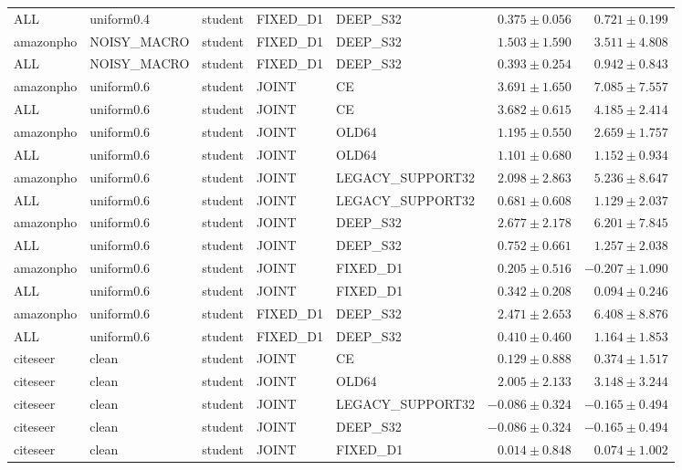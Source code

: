 \begin{longtable}{lllllrr}
ALL & uniform0.4 & student & FIXED\_D1 & DEEP\_S32 & $0.375 \pm 0.056$ & $0.721 \pm 0.199$ \\
amazonpho & NOISY\_MACRO & student & FIXED\_D1 & DEEP\_S32 & $1.503 \pm 1.590$ & $3.511 \pm 4.808$ \\
ALL & NOISY\_MACRO & student & FIXED\_D1 & DEEP\_S32 & $0.393 \pm 0.254$ & $0.942 \pm 0.843$ \\
amazonpho & uniform0.6 & student & JOINT & CE & $3.691 \pm 1.650$ & $7.085 \pm 7.557$ \\
ALL & uniform0.6 & student & JOINT & CE & $3.682 \pm 0.615$ & $4.185 \pm 2.414$ \\
amazonpho & uniform0.6 & student & JOINT & OLD64 & $1.195 \pm 0.550$ & $2.659 \pm 1.757$ \\
ALL & uniform0.6 & student & JOINT & OLD64 & $1.101 \pm 0.680$ & $1.152 \pm 0.934$ \\
amazonpho & uniform0.6 & student & JOINT & LEGACY\_SUPPORT32 & $2.098 \pm 2.863$ & $5.236 \pm 8.647$ \\
ALL & uniform0.6 & student & JOINT & LEGACY\_SUPPORT32 & $0.681 \pm 0.608$ & $1.129 \pm 2.037$ \\
amazonpho & uniform0.6 & student & JOINT & DEEP\_S32 & $2.677 \pm 2.178$ & $6.201 \pm 7.845$ \\
ALL & uniform0.6 & student & JOINT & DEEP\_S32 & $0.752 \pm 0.661$ & $1.257 \pm 2.038$ \\
amazonpho & uniform0.6 & student & JOINT & FIXED\_D1 & $0.205 \pm 0.516$ & $-0.207 \pm 1.090$ \\
ALL & uniform0.6 & student & JOINT & FIXED\_D1 & $0.342 \pm 0.208$ & $0.094 \pm 0.246$ \\
amazonpho & uniform0.6 & student & FIXED\_D1 & DEEP\_S32 & $2.471 \pm 2.653$ & $6.408 \pm 8.876$ \\
ALL & uniform0.6 & student & FIXED\_D1 & DEEP\_S32 & $0.410 \pm 0.460$ & $1.164 \pm 1.853$ \\
citeseer & clean & student & JOINT & CE & $0.129 \pm 0.888$ & $0.374 \pm 1.517$ \\
citeseer & clean & student & JOINT & OLD64 & $2.005 \pm 2.133$ & $3.148 \pm 3.244$ \\
citeseer & clean & student & JOINT & LEGACY\_SUPPORT32 & $-0.086 \pm 0.324$ & $-0.165 \pm 0.494$ \\
citeseer & clean & student & JOINT & DEEP\_S32 & $-0.086 \pm 0.324$ & $-0.165 \pm 0.494$ \\
citeseer & clean & student & JOINT & FIXED\_D1 & $0.014 \pm 0.848$ & $0.074 \pm 1.002$ \\

\end{longtable}

